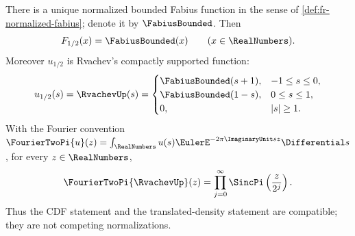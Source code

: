 \begin{theorem}
\label{thm:fr-fabius-identification}
There is a unique normalized bounded Fabius function in the sense of
\cref{def:fr-normalized-fabius}; denote it by \(\FabiusBounded\).  Then
\begin{equation}
 F_{1/2}(x)=\FabiusBounded(x)\qquad(x\in\RealNumbers).
 \label{eq:fr-fabius-cdf}
\end{equation}
Moreover \(u_{1/2}\) is Rvachev's compactly supported function:
\begin{equation}
 u_{1/2}(s)=\RvachevUp(s)=
 \begin{cases}
   \FabiusBounded(s+1),&-1\le s\le0,\\
   \FabiusBounded(1-s),&0\le s\le1,\\
   0,&|s|\ge1.
 \end{cases}
 \label{eq:fr-up-fold}
\end{equation}
With the Fourier convention
\(\FourierTwoPi{u}(z)=\int_\RealNumbers u(s)\EulerE^{-2\pi\ImaginaryUnit sz}\Differential s\), for every
\(z\in\RealNumbers\),
\begin{equation}
 \FourierTwoPi{\RvachevUp}(z)=\prod_{j=0}^{\infty}
 \SincPi\left(\frac{z}{2^j}\right).
 \label{eq:fr-rvachev-product}
\end{equation}
Thus the CDF statement and the translated-density statement are compatible;
they are not competing normalizations.
\end{theorem}

